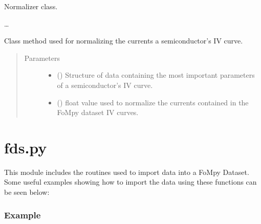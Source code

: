 \documentclass[letterpaper,10pt,english,openany, oneside]{sphinxmanual}
\begin{document}
\begin{fulllineitems}
\label{\detokenize{index:fompy.conditioning.normalizer}}
Normalizer class.

…

\begin{fulllineitems}
\label{\detokenize{index:fompy.conditioning.normalizer.normalize}}
Class method used for normalizing the currents a semiconductor’s IV curve.

\end{fulllineitems}

\begin{quote}\begin{description}
\item[{Parameters}] \leavevmode\begin{itemize}
\item {} 
 () \textendash{} Structure of data containing the most important parameters of a semiconductor’s IV curve.

\item {} 
 () \textendash{} float value used to normalize the currents contained in the FoMpy dataset IV curves.

\end{itemize}

\end{description}\end{quote}

\end{fulllineitems}

\label{\detokenize{index:module-fompy.fds}}

\section{fds.py}
\label{\detokenize{index:fds-py}}
This module includes the routines used to import data into a FoMpy Dataset. Some useful
examples showing how to import the data using these functions can be seen below:
\subsubsection*{Example}
\end{document}
